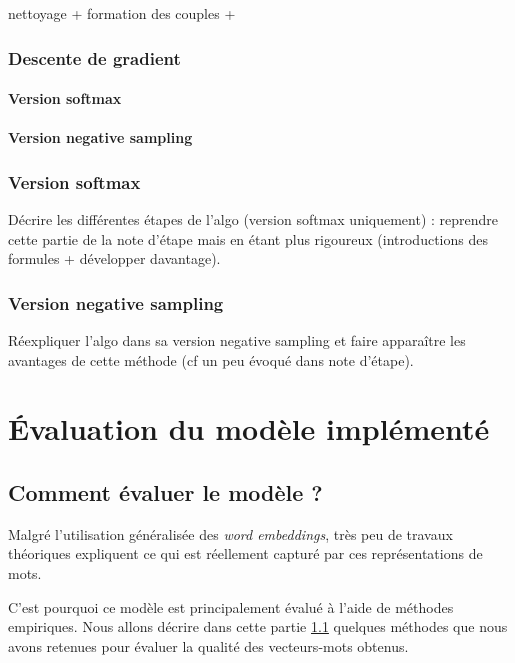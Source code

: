 \documentclass[11pt,french,french]{article}
\begin{document}
nettoyage + formation des couples +

\subsubsection{Descente de gradient}\label{subsec:descentedegradient}

\paragraph{Version softmax}\label{version-softmax}

\paragraph{Version negative sampling}\label{version-negative-sampling}

\subsubsection{Version softmax}\label{version-softmax-1}

Décrire les différentes étapes de l'algo (version softmax uniquement) :
reprendre cette partie de la note d'étape mais en étant plus rigoureux
(introductions des formules + développer davantage).

\subsubsection{Version negative
sampling}\label{version-negative-sampling-1}

Réexpliquer l'algo dans sa version negative sampling et faire apparaître
les avantages de cette méthode (cf un peu évoqué dans note d'étape).

\section{Évaluation du modèle implémenté}\label{sec:evaluation}

\subsection{Comment évaluer le modèle ?}\label{sec:commentEvaluer}

Malgré l'utilisation généralisée des \emph{word embeddings}, très peu de
travaux théoriques expliquent ce qui est réellement capturé par ces
représentations de mots.

C'est pourquoi ce modèle est principalement évalué à l'aide de méthodes
empiriques. Nous allons décrire dans cette partie
\ref{sec:commentEvaluer} quelques méthodes que nous avons retenues pour
évaluer la qualité des vecteurs-mots obtenus.
\end{document}
